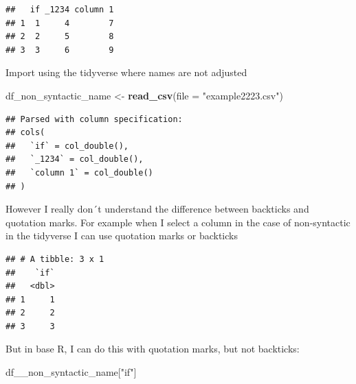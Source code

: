 \documentclass[]{book}
\newenvironment{Shaded}{\begin{snugshade}}{\end{snugshade}}
\newcommand{\DataTypeTok}[1]{\textcolor[rgb]{0.13,0.29,0.53}{#1}}
\newcommand{\KeywordTok}[1]{\textcolor[rgb]{0.13,0.29,0.53}{\textbf{#1}}}
\newcommand{\NormalTok}[1]{#1}
\newcommand{\OperatorTok}[1]{\textcolor[rgb]{0.81,0.36,0.00}{\textbf{#1}}}
\newcommand{\StringTok}[1]{\textcolor[rgb]{0.31,0.60,0.02}{#1}}
\begin{document}
\begin{verbatim}
##   if _1234 column 1
## 1  1     4        7
## 2  2     5        8
## 3  3     6        9
\end{verbatim}

Import using the tidyverse where names are not adjusted

\begin{Shaded}
\begin{Highlighting}[]
\NormalTok{df_non_syntactic_name  <-}\StringTok{ }\KeywordTok{read_csv}\NormalTok{(}\DataTypeTok{file =} \StringTok{"example2223.csv"}\NormalTok{)}
\end{Highlighting}
\end{Shaded}

\begin{verbatim}
## Parsed with column specification:
## cols(
##   `if` = col_double(),
##   `_1234` = col_double(),
##   `column 1` = col_double()
## )
\end{verbatim}

However I really don´t understand the difference between backticks and quotation marks. For example when I select a column in the case of non-syntactic in the tidyverse I can use quotation marks or backticks

\begin{Shaded}
\end{Shaded}

\begin{verbatim}
## # A tibble: 3 x 1
##    `if`
##   <dbl>
## 1     1
## 2     2
## 3     3
\end{verbatim}

\begin{Shaded}
\end{Shaded}

But in base R, I can do this with quotation marks, but not backticks:

\begin{Shaded}
\begin{Highlighting}[]
\NormalTok{df__non_syntactic_name[}\StringTok{"if"}\NormalTok{]}
\end{Highlighting}
\end{Shaded}
\end{document}
